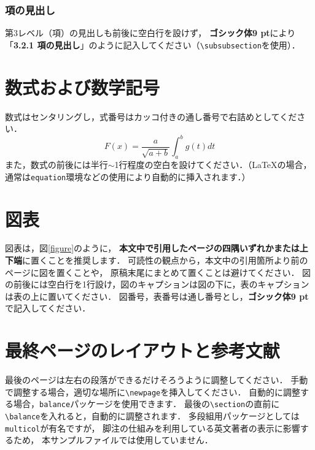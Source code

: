 \documentclass[a4paper]{jarticle}
\begin{document}
\subsubsection{項の見出し}

第3レベル（項）の見出しも前後に空白行を設けず，
{\bf ゴシック体9 pt}により「{\bf 3.2.1 項の見出し}」のように記入してください（\verb+\subsubsection+を使用）．

\section{数式および数学記号}%

数式はセンタリングし，式番号はカッコ付きの通し番号で右詰めとしてください．
\begin{equation}
  F(x) = \frac{a}{\sqrt{a+b}}\int_a^b{g(t)}dt
\end{equation}
また，数式の前後には半行$\sim$1行程度の空白を設けてください．（\LaTeX の場合，
通常は\verb+equation+環境などの使用により自動的に挿入されます．）

\section{図表}%

図表は，図\ref{figure}のように，
{\bf 本文中で引用したページの四隅いずれかまたは上下端}に置くことを推奨します．
可読性の観点から，本文中の引用箇所より前のページに図を置くことや，
原稿末尾にまとめて置くことは避けてください．
図の前後には空白行を1行設け，図のキャプションは図の下に，表のキャプションは表の上に置いてください．
図番号，表番号は通し番号とし，{\bf ゴシック体9 pt}で記入してください．


\section{最終ページのレイアウトと参考文献}

最後のページは左右の段落ができるだけそろうように調整してください．
手動で調整する場合，適切な場所に\verb+\newpage+を挿入してください．
自動的に調整する場合，\verb+balance+パッケージを使用できます．
最後の\verb+\section+の直前に\verb+\balance+を入れると，自動的に調整されます．
多段組用パッケージとしては\verb+multicol+が有名ですが，
脚注の仕組みを利用している英文著者の表示に影響するため，
本サンプルファイルでは使用していません．
\end{document}
